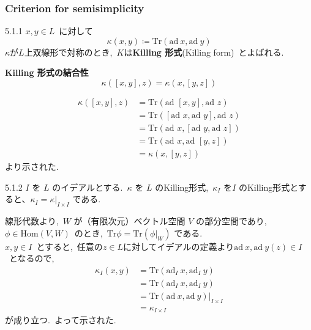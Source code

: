 \documentclass[uplatex,dvipdfmx]{jsarticle}
\begin{document}
\subsubsection{Criterion for semisimplicity}
\begin{mydef}{5.1.1}
    $x,y\in L$~に対して
    \begin{equation*}
        \kappa(x,y)\coloneqq \text{Tr}(\text{ad}~x,\text{ad}~y)
    \end{equation*}
    $\kappa$が$L$上双線形で対称のとき,~$K$は\textbf{Killing 形式}(Killing form)~とよばれる.
\end{mydef}
\textbf{Killing 形式の結合性}\\
\begin{equation*}
    \kappa([x, y], z) = \kappa(x, [y, z])
\end{equation*}
\begin{myproof}
    \begin{equation*}
        \begin{split}
            \kappa([x, y], z) &=\text{Tr}(\text{ad }[x, y],\text{ad } z)\\
            &=\text{Tr}([\text{ad }x, \text{ad }y],\text{ad } z)\\
            &=\text{Tr}(\text{ad }x, [\text{ad }y,\text{ad } z])\\
            &=\text{Tr}(\text{ad }x, \text{ad }[y,z])\\
            &=\kappa(x, [y, z])
        \end{split}
    \end{equation*}
    より示された.
\end{myproof}
\begin{mylemma}{5.1.2}
    $I$ を $L$ のイデアルとする.~$\kappa$ を $L$ のKilling形式,~$\kappa_I$ を$I$ のKilling形式とすると、$\kappa_I = \kappa|_{I \times I}$ である.
\end{mylemma}
\begin{myproof}
    線形代数より,~$W$ が（有限次元）ベクトル空間 $V$ の部分空間であり,~$\phi\in \text{Hom}(V,W)$~のとき,~$\text{Tr} \phi = \text{Tr}(\phi|_W)$ である.\\
    $x,y\in I$~とすると,~任意の$z\in L$に対してイデアルの定義より$\text{ad}~x,\text{ad}~y(z)\in I$~となるので,~
    \begin{equation*}
        \begin{split}
            \kappa _I(x,y)&= \text{Tr}(\text{ad}_I~x,\text{ad}_I~y)\\
            &=\text{Tr}(\text{ad}_I~x,\text{ad}_I~y)\\
            &=\text{Tr}(\text{ad}~x,\text{ad}~y)|_{I\times I}\\
            &=\kappa_{I\times I}
        \end{split}
    \end{equation*}
    が成り立つ.~よって示された.
\end{myproof}
\end{document}
